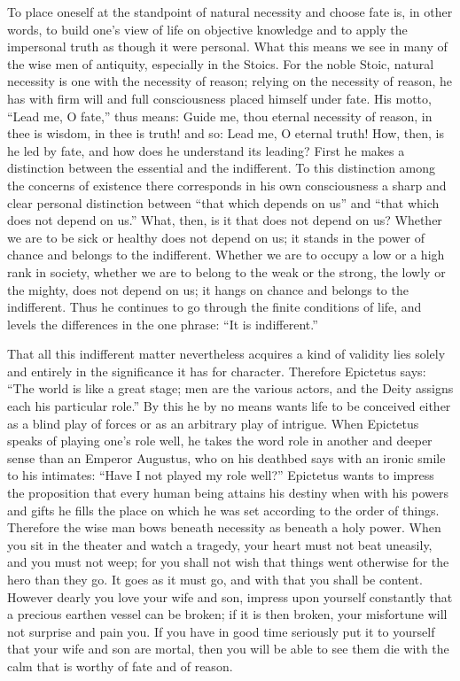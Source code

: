 \documentclass[12pt]{book}
\newcommand{\opage}[1]{\marginnote{\footnotesize\textit{[#1]}}}
\begin{document}
To place oneself at the standpoint of natural necessity and choose fate
is, in other words, to build one's view of life on objective knowledge
and to apply the impersonal truth as though it were personal. What this
means we see in many of the wise men of antiquity, especially in the
Stoics. For the noble Stoic, natural necessity is one with the necessity
of reason; relying on the necessity of reason, he has with firm will and
full consciousness placed himself under fate. His motto, ``Lead me, O
fate,'' thus means: Guide me, thou eternal necessity of reason, in thee
is wisdom, in thee is truth! and so: Lead me, O eternal truth! How, then,
is he led by fate, and how does he understand its leading? First he
makes a distinction between the essential and the indifferent. To this
distinction among the concerns of existence there corresponds in his own
consciousness a sharp and clear personal distinction between ``that
which depends on us'' and ``that which does not depend on us.'' What,
then, is it that does not depend on us? Whether we are to be sick or
healthy does not depend on us; it stands in the power of chance and
belongs to the indifferent. Whether we are to occupy a low or a high
rank in society, whether we are to belong to the weak or the strong, the
lowly or the mighty, does not depend on us; it hangs on chance and
belongs to the indifferent. Thus he continues to go through the finite
conditions of life, and levels the differences in the one phrase: ``It
is indifferent.''

That all this indifferent matter nevertheless acquires a kind of
validity lies solely and entirely in the significance it has for
character. Therefore Epictetus says: ``The world is like a
\opage{210}\setcounter{footnote}{0}%
great stage; men are the various actors, and the Deity assigns each his
particular role.'' By this he by no means wants life to be conceived
either as a blind play of forces or as an arbitrary play of intrigue.
When Epictetus speaks of playing one's role well, he takes the word
role in another and deeper sense than an Emperor Augustus, who on his
deathbed says with an ironic smile to his intimates: ``Have I not played
my role well?'' Epictetus wants to impress the proposition that every
human being attains his destiny when with his powers and gifts he fills
the place on which he was set according to the order of things.
Therefore the wise man bows beneath necessity as beneath a holy power.
When you sit in the theater and watch a tragedy, your heart must not
beat uneasily, and you must not weep; for you shall not wish that things
went otherwise for the hero than they go. It goes as it must go, and
with that you shall be content. However dearly you love your wife and
son, impress upon yourself constantly that a precious earthen vessel can
be broken; if it is then broken, your misfortune will not surprise and
pain you. If you have in good time seriously put it to yourself that
your wife and son are mortal, then you will be able to see them die with
the calm that is worthy of fate and of reason.
\end{document}
